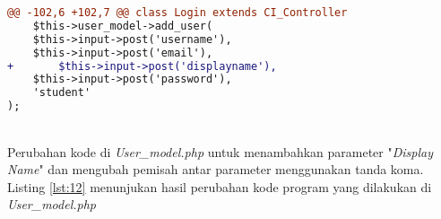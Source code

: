 \begin{lstlisting}[language=diff, caption=Perubahan kode program pada \textit{Login.php}, label=lst:11, basicstyle=\ttfamily, frame=single,
columns=fullflexible, keepspaces=true, breaklines=true]
@@ -102,6 +102,7 @@ class Login extends CI_Controller
	$this->user_model->add_user(
	$this->input->post('username'),
	$this->input->post('email'),
+   	$this->input->post('displayname'),
	$this->input->post('password'),
	'student'
);
\end{lstlisting}
~\\
Perubahan kode di \textit{User\_model.php} untuk menambahkan parameter "\textit{Display Name}" dan mengubah pemisah antar parameter menggunakan tanda koma. Listing \ref{lst:12} menunjukan hasil perubahan kode program yang dilakukan di \textit{User\_model.php}

